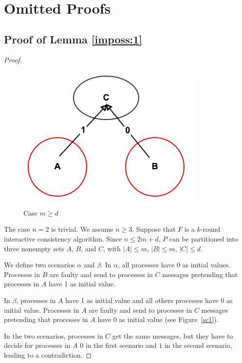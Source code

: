 
\section{Omitted Proofs}

\subsection{Proof of Lemma \ref{imposs:1}} \label{app:imposs:1}
\begin{proof}
\begin{figure}[h]
  \centering
  \includegraphics[scale=0.35]{impossible1.png}
  \caption{Case $m \geqslant d$  }
\end{figure}\label{sc1}

  The case $n=2$ is trivial. We assume $n \geqslant 3$.
  Suppose that $F$ is a $k$-round interactive consistency algorithm. Since $n \leqslant
  2m+d$, $P$ can be partitioned into three nonempty sets $A$, $B$, and $C$,
  with $| A | \leqslant m$, $| B | \leqslant m$, $| C | \leqslant d$. 
  
  We define two scenarios $\alpha$ and $\beta$.
  In $\alpha$, all processes have 0 as initial values.
  Processes in $B$ are faulty and send  to processes in $C$ messages
  pretending that processes in $A$ have 1 as initial value.
  
   In $\beta$, processes in $A$ have 1 as initial value and all  others processes have 0 as initial value.
  Processes in $A$ are faulty and send to processes in $C$ messages 
  pretending that processes in $A$ have 0 as initial value (see Figure~\ref{sc1}).
  
  In the two scenarios, processes in $C$ get the same messages, but they have to decide
  for processes in $A$ $0$ in the first scenario and $1$ in the second scenario,
  leading to a contradiction.
    

\end{proof}
